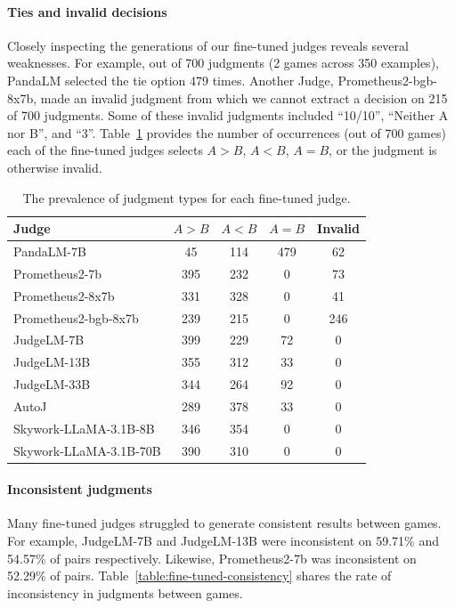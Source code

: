 \documentclass{article} %
\begin{document}
\paragraph{Ties and invalid decisions} Closely inspecting the generations of our fine-tuned judges reveals several weaknesses. For example, out of 700 judgments (2 games across 350 examples), PandaLM selected the tie option 479 times. Another Judge, Prometheus2-bgb-8x7b, made an invalid judgment from which we cannot extract a decision on 215 of 700 judgments. Some of these invalid judgments included ``10/10'', ``Neither A nor B'', and ``3''. Table~\ref{table:fine-tuned-decisions} provides the number of occurrences (out of 700 games) each of the fine-tuned judges selects $A>B$, $A<B$, $A=B$, or the judgment is otherwise invalid.

\begin{table}
\centering
\begin{tabular}{lcccc}\toprule
Judge & $A>B$ & $A<B$ & $A=B$ & Invalid\\ \midrule
PandaLM-7B & 45 & 114 & 479 & 62\\
Prometheus2-7b & 395 & 232 & 0 & 73\\
Prometheus2-8x7b & 331 & 328 & 0 & 41\\
Prometheus2-bgb-8x7b & 239 & 215 & 0 & 246\\
JudgeLM-7B & 399 & 229 & 72 & 0\\
JudgeLM-13B & 355 & 312 & 33 & 0\\
JudgeLM-33B & 344 & 264 & 92 & 0\\
AutoJ & 289 & 378 & 33 & 0\\
Skywork-LLaMA-3.1B-8B & 346 & 354 & 0 & 0\\
Skywork-LLaMA-3.1B-70B & 390 & 310 & 0 & 0\\ \bottomrule
\end{tabular}
\caption{The prevalence of judgment types for each fine-tuned judge.}
\label{table:fine-tuned-decisions}
\end{table}

\paragraph{Inconsistent judgments}
Many fine-tuned judges struggled to generate consistent results between games. For example, JudgeLM-7B and JudgeLM-13B were inconsistent on 59.71\% and 54.57\% of pairs respectively. Likewise, Prometheus2-7b was inconsistent on 52.29\% of pairs. Table~\ref{table:fine-tuned-consistency} shares the rate of inconsistency in judgments between games. 
\end{document}
